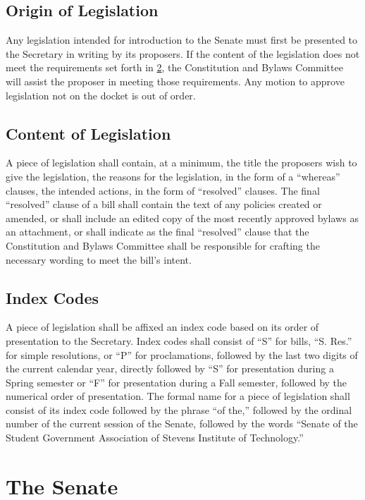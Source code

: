 \documentclass[12pt]{scrreprt}
\begin{document}
\section{Origin of Legislation}
Any legislation intended for introduction to the Senate must first be 
presented to the Secretary in writing by its proposers. If the content of the legislation does not meet the requirements set forth in \ref{sec:bill_content}, the Constitution and Bylaws Committee will assist the proposer in meeting those requirements. Any motion to approve legislation not on the docket is out of order. 

\section{Content of Legislation} \label{sec:bill_content}
A piece of legislation shall contain, at a minimum, the title 
the proposers wish to give the legislation, the reasons for the legislation, in the form of 
a ``whereas'' clauses, the intended actions, in the form of ``resolved'' 
clauses. The final ``resolved'' clause of a bill shall contain the text of any policies 
created or amended, or shall include an edited copy of the most recently 
approved bylaws as an attachment, or shall indicate as the final ``resolved'' 
clause that the Constitution and Bylaws Committee shall be responsible for 
crafting the necessary wording to meet the bill's intent. 

\section{Index Codes}
A piece of legislation shall be affixed an index code based on its order of presentation to 
the Secretary. Index codes shall consist of “S” for bills, “S. Res.” for simple resolutions, or “P” for proclamations, followed by the last two digits of the current calendar year, directly followed by “S” for presentation during a Spring semester or “F” for presentation during a Fall semester, followed by the numerical order of presentation. The formal name 
for a piece of legislation shall consist of its index code followed by the 
phrase ``of the,'' followed by the ordinal number of the current session of 
the Senate, followed by the words ``Senate of the Student Government Association of Stevens Institute of Technology.'' 

\chapter{The Senate}
\end{document}
